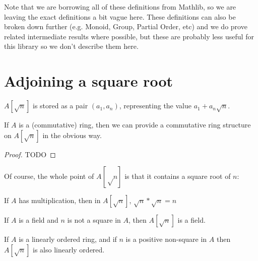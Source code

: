 Note that we are borrowing all of these definitions from Mathlib, so we are
leaving the exact definitions a bit vague here.  These definitions can also be
broken down further (e.g. Monoid, Group, Partial Order, etc) and we do prove
related intermediate results where possible, but these are probably less useful
for this library so we don't describe them here.

\section{Adjoining a square root}


\begin{definition}
  \label{def:adjoin}
  \leanok
  $A[\sqrt{n}]$ is stored as a pair $(a_1, a_n)$, representing the value
  $a_1 + a_n\sqrt{n}$.
\end{definition}


\begin{lemma}
  \label{thm:adjoinRing}
  \leanok
  If $A$ is a (commutative) ring, then we can provide a commutative ring structure
  on $A[\sqrt{n}]$ in the obvious way.
\end{lemma}

\begin{proof}
  TODO
\end{proof}


Of course, the whole point of $A[√n]$ is that it contains a square root of $n$:
\begin{theorem}
  \label{thm:adjoinHasSqrtN}
  If $A$ has multiplication, then in $A[\sqrt{n}]$, $\sqrt{n} * \sqrt{n} = n$
\end{theorem}


\begin{lemma}
  \label{thm:adjoinField}
  \leanok
  If $A$ is a field and $n$ is not a square in $A$, then $A[\sqrt{n}]$ is a
  field.
\end{lemma}


\begin{lemma}
  \label{thm:adjoinOrderedRing}

  If $A$ is a linearly ordered ring, and if $n$ is a positive non-square in $A$
  then $A[\sqrt{n}]$ is also linearly ordered.
\end{lemma}

